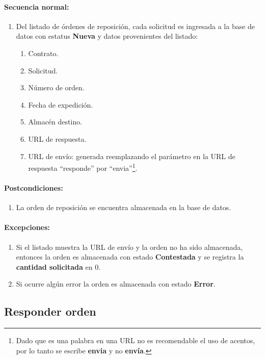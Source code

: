 \paragraph{Secuencia normal:}
\begin{enumerate}
  \item Del listado de órdenes de reposición, cada solicitud es ingresada a la base de datos con estatus \textbf{Nueva} y datos provenientes del listado:
  \begin{enumerate}
    \item Contrato.
    \item Solicitud.
    \item Número de orden.
    \item Fecha de expedición.
    \item Almacén destino.
    \item URL de respuesta.
    \item URL de envío: generada reemplazando el parámetro en la URL de respuesta ``responde'' por ``envia''\footnote{Dado que es una palabra en una URL no es recomendable el uso de acentos, por lo tanto se escribe \textbf{envia} y no \textbf{envía}.}.
  \end{enumerate}
\end{enumerate}
\paragraph{Postcondiciones:}
\begin{enumerate}
  \item La orden de reposición se encuentra almacenada en la base de datos.
\end{enumerate}
\paragraph{Excepciones:}
\begin{enumerate}
  \item Si el listado muestra la URL de envío y la orden no ha sido almacenada, entonces la orden es almacenada con estado \textbf{Contestada} y se registra la \textbf{cantidad solicitada} en 0.
  \item Si ocurre algún error la orden es almacenada con estado \textbf{Error}.
\end{enumerate}


\subsection{Responder orden}\label{cu-responder-orden}
